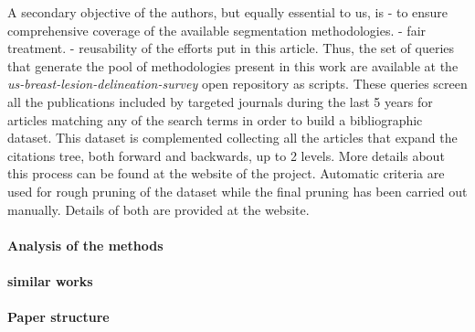 A secondary objective of the authors, but equally essential to us, is
- to ensure comprehensive coverage of the available segmentation methodologies.
- fair treatment.
- reusability of the efforts put in this article.
Thus, the set of queries that generate the pool of methodologies present in this work are available at the \emph{us-breast-lesion-delineation-survey} open repository as scripts.
These queries screen all the publications included by targeted journals during the last 5 years for articles matching any of the search terms in order to build a bibliographic dataset. This dataset is complemented collecting all the articles that expand the citations tree, both forward and backwards, up to 2 levels. More details about this process can be found at the website of the project. Automatic criteria are used for rough pruning of the dataset while the final pruning has been carried out manually. Details of both are provided at the website.

\paragraph{Analysis of the methods}
\label{sec:intro:analysis_of_the_methods}

\paragraph{similar works}
\label{sec:intro:similar_works}

\paragraph{Paper structure}
\label{sec:intro:paper_structure}


